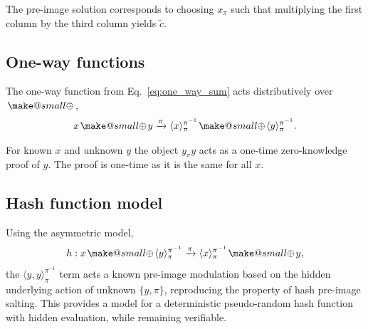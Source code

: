 \documentclass[twocolumn, aps, amsmath, amssymb, nofootinbib, superscriptaddress, longbibliography, doublefloatfix, table-of-contents, eqsecnum, rmp]{revtex4-2}
\makeatletter
\def\braid#1#2#3#4{\langle#1,#2\rangle_{#3}^{#4}}
\def\selfbraid#1#2#3{\langle#1\rangle_{#2}^{#3}}
\def\comm#1#2#3#4{[#1,#2]_{#3}^{#4}}
\newcommand{\soplus}{{{\hspace{1pt}}{\mathbin{\mathpalette\make@small\oplus}}}{\hspace{1pt}}}
\newcommand{\make@small}[2]{%
  \vcenter{\hbox{%
    \scalebox{0.6}{$\m@th#1#2$}%
  }}%
}
\makeatother
\begin{document}
The pre-image solution corresponds to choosing $x_\pi$ such that multiplying the first column by the third column yields $\tilde{c}$.

\subsection{One-way functions}

The one-way function from Eq.~\eqref{eq:one_way_sum} acts distributively over $\soplus$,
\begin{align}
	x\soplus y \xrightarrow{\pi} \selfbraid{x}{\pi}{\pi^{-1}} \soplus \selfbraid{y}{\pi}{\pi^{-1}}.
\end{align}


For known $x$ and unknown $y$ the object $y_\pi y$ acts as a one-time zero-knowledge proof of $y$. The proof is one-time as it is the same for all $x$.

\subsection{Hash function model}

Using the asymmetric model,
\begin{align}
	h: x\soplus \selfbraid{y}{\pi}{\pi^{-1}} \xrightarrow{\pi} \selfbraid{x}{\pi}{\pi^{-1}} \soplus y,
\end{align}
the $\braid{y}{y}{\pi}{\pi^{-1}}$ term acts a known pre-image modulation based on the hidden underlying action of unknown $\{y,\pi\}$, reproducing the property of hash pre-image salting. This provides a model for a deterministic pseudo-random hash function with hidden evaluation, while remaining verifiable.
\end{document}
